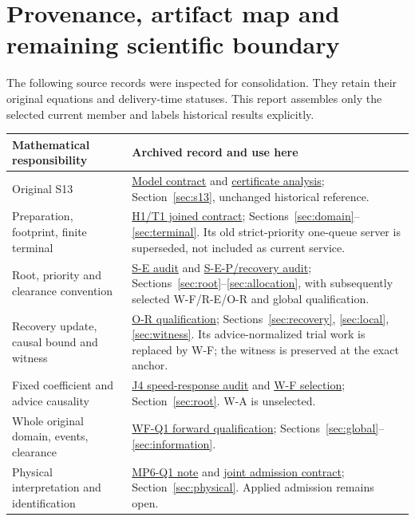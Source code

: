 \section{Provenance, artifact map and remaining scientific boundary}
\label{sec:provenance}
The following source records were inspected for consolidation. They retain
their original equations and delivery-time statuses. This report assembles
only the selected current member and labels historical results explicitly.

\begin{longtable}{>{\raggedright\arraybackslash}p{35mm}>{\raggedright\arraybackslash}p{110mm}}
\toprule
Mathematical responsibility & Archived record and use here\\
\midrule
\endhead
Original S13 &
\href{../s13/s13_m2_model_contract.pdf}{Model contract} and
\href{../s13/s13_m2_certificate_analysis.pdf}{certificate analysis};
Section~\ref{sec:s13}, unchanged historical reference.\\[6pt]
Preparation, footprint, finite terminal &
\href{vsl_h1_t1_joined_contract.pdf}{H1/T1 joined contract};
Sections~\ref{sec:domain}--\ref{sec:terminal}. Its old strict-priority
one-queue server is superseded, not included as current service.\\[6pt]
Root, priority and clearance convention &
\href{vsl_se_admission_and_transition_audit.pdf}{S-E audit} and
\href{vsl_sep_recovery_and_clearance_audit.pdf}{S-E-P/recovery audit};
Sections~\ref{sec:root}--\ref{sec:allocation}, with subsequently selected
W-F/R-E/O-R and global qualification.\\[6pt]
Recovery update, causal bound and witness &
\href{vsl_or_recovery_qualification.pdf}{O-R qualification};
Sections~\ref{sec:recovery}, \ref{sec:local}, \ref{sec:witness}.
Its advice-normalized trial work is replaced by W-F; the witness is
preserved at the exact anchor.\\[6pt]
Fixed coefficient and advice causality &
\href{vsl_j4_speed_response_audit.pdf}{J4 speed-response audit} and
\href{../../reporting/research_readiness/vsl_wf_selection_and_scope.md}{W-F selection};
Section~\ref{sec:root}. W-A is unselected.\\[6pt]
Whole original domain, events, clearance &
\href{vsl_wf_forward_qualification.pdf}{WF-Q1 forward qualification};
Sections~\ref{sec:global}--\ref{sec:information}.\\[6pt]
Physical interpretation and identification &
\href{vsl_mp6_physical_identifiability.pdf}{MP6-Q1 note} and
\href{vsl_mp6_joint_physical_admission_contract.md}{joint admission contract};
Section~\ref{sec:physical}. Applied admission remains open.\\
\bottomrule
\end{longtable}

